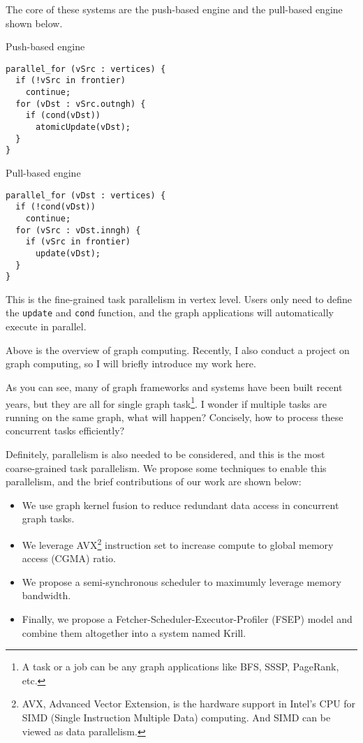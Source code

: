 \documentclass[english]{thesis}
\begin{document}
The core of these systems are the push-based engine and the pull-based engine shown below.
\begin{center}
\begin{minipage}{0.4\linewidth}
\centering Push-based engine
\begin{lstlisting}
parallel_for (vSrc : vertices) {
  if (!vSrc in frontier)
    continue;
  for (vDst : vSrc.outngh) {
    if (cond(vDst))
      atomicUpdate(vDst);
  }
}
\end{lstlisting}
\end{minipage}
\begin{minipage}{0.4\linewidth}
\centering Pull-based engine
\begin{lstlisting}
parallel_for (vDst : vertices) {
  if (!cond(vDst))
    continue;
  for (vSrc : vDst.inngh) {
    if (vSrc in frontier)
      update(vDst);
  }
}
\end{lstlisting}
\end{minipage}
\end{center}
This is the fine-grained task parallelism in vertex level.
Users only need to define the \verb'update' and \verb'cond' function, and the graph applications will automatically execute in parallel.

\bigskip
Above is the overview of graph computing.
Recently, I also conduct a project on graph computing, so I will briefly introduce my work here.
\bigskip

As you can see, many of graph frameworks and systems have been built recent years, but they are all for single graph task\footnote{A task or a job can be any graph applications like BFS, SSSP, PageRank, etc.}.
I wonder if multiple tasks are running on the same graph, what will happen?
Concisely, how to process these concurrent tasks efficiently?

Definitely, parallelism is also needed to be considered, and this is the most coarse-grained task parallelism.
We propose some techniques to enable this parallelism, and the brief contributions of our work are shown below:
\begin{itemize}
	\item We use graph kernel fusion to reduce redundant data access in concurrent graph tasks.
	\item We leverage AVX\footnote{AVX, Advanced Vector Extension, is the hardware support in Intel's CPU for SIMD (Single Instruction Multiple Data) computing. And SIMD can be viewed as data parallelism.} instruction set to increase compute to global memory access (CGMA) ratio.
	\item We propose a semi-synchronous scheduler to maximumly leverage memory bandwidth.
	\item Finally, we propose a Fetcher-Scheduler-Executor-Profiler (FSEP) model and combine them altogether into a system named Krill.
\end{itemize}
\end{document}
